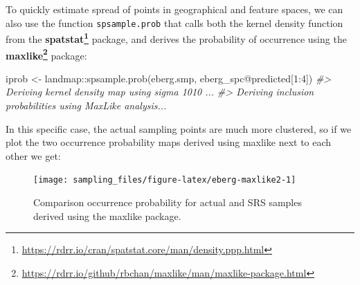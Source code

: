 \documentclass[
  graybox,natbib,nospthms]{svmono}
\newenvironment{Shaded}{\begin{snugshade}}{\end{snugshade}}
\newcommand{\AttributeTok}[1]{\textcolor[rgb]{0.61,0.61,0.61}{#1}}
\newcommand{\CommentTok}[1]{\textcolor[rgb]{0.37,0.37,0.37}{\textit{#1}}}
\newcommand{\DecValTok}[1]{\textcolor[rgb]{0.06,0.06,0.06}{#1}}
\newcommand{\FunctionTok}[1]{\textcolor[rgb]{0,0,0}{#1}}
\newcommand{\NormalTok}[1]{#1}
\newcommand{\OtherTok}[1]{\textcolor[rgb]{0.37,0.37,0.37}{#1}}
\newcommand{\SpecialCharTok}[1]{\textcolor[rgb]{0,0,0}{#1}}
\newcommand{\StringTok}[1]{\textcolor[rgb]{0.5,0.5,0.5}{#1}}
\renewcommand{\href}[2]{#2 (\url{#1})}
\renewcommand{\href}[2]{#2\footnote{\url{#1}}}
\begin{document}
To quickly estimate spread of points in geographical and feature spaces, we can
also use the function \texttt{spsample.prob} that calls both the kernel density function
from the \textbf{\href{https://rdrr.io/cran/spatstat.core/man/density.ppp.html}{spatstat}} package, and derives the probability of occurrence using the
\textbf{\href{https://rdrr.io/github/rbchan/maxlike/man/maxlike-package.html}{maxlike}} package:

\begin{Shaded}
\begin{Highlighting}[]
\NormalTok{iprob }\OtherTok{\textless{}{-}}\NormalTok{ landmap}\SpecialCharTok{::}\FunctionTok{spsample.prob}\NormalTok{(eberg.smp, eberg\_spc}\SpecialCharTok{@}\NormalTok{predicted[}\DecValTok{1}\SpecialCharTok{:}\DecValTok{4}\NormalTok{])}
\CommentTok{\#\textgreater{} Deriving kernel density map using sigma 1010 ...}
\CommentTok{\#\textgreater{} Deriving inclusion probabilities using MaxLike analysis...}
\end{Highlighting}
\end{Shaded}

In this specific case, the actual sampling points are much more clustered, so if we plot
the two occurrence probability maps derived using maxlike next to each other we get:

\begin{Shaded}
\end{Shaded}

\begin{figure}

{\centering \texttt{[image: sampling\_files/figure-latex/eberg-maxlike2-1]} 

}

\caption{Comparison occurrence probability for actual and SRS samples derived using the maxlike package.}\label{fig:eberg-maxlike2}
\end{figure}
\end{document}
